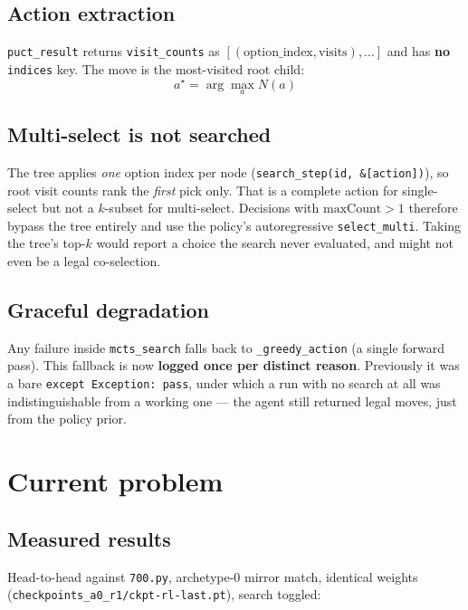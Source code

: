 \documentclass[11pt,a4paper]{article}
\newcommand{\code}[1]{\texttt{\small #1}}
\newcommand{\file}[1]{\texttt{\small #1}}
\begin{document}
\subsection{Action extraction}

\code{puct\_result} returns \code{visit\_counts} as
$[(\text{option\_index}, \text{visits}), \dots]$ and has \textbf{no}
\code{indices} key. The move is the most-visited root child:
\begin{equation*}
a^\star = \arg\max_{a} N(a)
\end{equation*}

\subsection{Multi-select is not searched}

The tree applies \emph{one} option index per node
(\code{search\_step(id, \&[action])}), so root visit counts rank the
\emph{first} pick only. That is a complete action for single-select but not a
$k$-subset for multi-select. Decisions with $\text{maxCount} > 1$ therefore
bypass the tree entirely and use the policy's autoregressive
\code{select\_multi}. Taking the tree's top-$k$ would report a choice the
search never evaluated, and might not even be a legal co-selection.

\subsection{Graceful degradation}

Any failure inside \code{mcts\_search} falls back to \code{\_greedy\_action}
(a single forward pass). This fallback is now \textbf{logged once per distinct
reason}. Previously it was a bare \code{except Exception: pass}, under which a
run with no search at all was indistinguishable from a working one --- the
agent still returned legal moves, just from the policy prior.

\section{Current problem}
\label{sec:problem}

\subsection{Measured results}

Head-to-head against \file{700.py}, archetype-0 mirror match, identical
weights (\file{checkpoints\_a0\_r1/ckpt-rl-last.pt}), search toggled:
\end{document}
